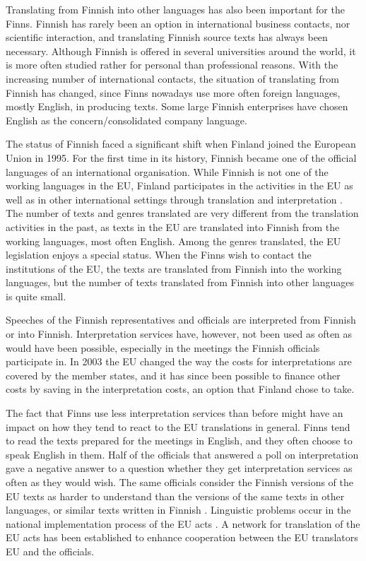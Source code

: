 \documentclass[]{../../metanetpaper}
\begin{document}
\begin{multicols}{2}
Translating from Finnish into other languages has also been important
for the Finns. Finnish has rarely been an option in international
business contacts, nor scientific interaction, and translating Finnish
source texts has always been necessary. Although Finnish is offered in
several universities around the world, it is more often studied rather
for personal than professional reasons.  With the increasing number of
international contacts, the situation of translating from Finnish has
changed, since Finns nowadays use more often foreign languages, mostly
English, in producing texts. Some large Finnish enterprises have
chosen English as the concern/consolidated company language.

The status of Finnish faced a significant shift when Finland joined
the European Union in 1995. For the first time in its history, Finnish
became one of the official languages of an international
organisation. While Finnish is not one of the working languages in the
EU, Finland participates in the activities in the EU as well as in
other international settings through translation and
interpretation \cite{Tulevaisuus2009}. The number of texts and genres
translated are very different from the translation activities in the
past, as texts in the EU are translated into Finnish from the working
languages, most often English.  Among the genres translated, the EU
legislation enjoys a special status. When the Finns wish to contact
the institutions of the EU, the texts are translated from Finnish into
the working languages, but the number of texts translated from Finnish
into other languages is quite small.

Speeches of the Finnish representatives and officials are interpreted
from Finnish or into Finnish. Interpretation services have, however,
not been used as often as would have been possible, especially in the
meetings the Finnish officials participate in. In 2003 the EU changed
the way the costs for interpretations are covered by the member
states, and it has since been possible to finance other costs by
saving in the interpretation costs, an option that Finland chose to
take.

The fact that Finns use less interpretation services than before might
have an impact on how they tend to react to the EU translations in
general. Finns tend to read the texts prepared for the meetings in
English, and they often choose to speak English in them. Half of the
officials that answered a poll on interpretation gave a negative
answer to a question whether they get interpretation services as often
as they would wish. The same officials consider the Finnish versions
of the EU texts as harder to understand than the versions of the same
texts in other languages, or similar texts written in Finnish
\cite{Piehl2008}. Linguistic problems occur in the national
implementation process of the EU acts \cite{OECD2010}. A network
for translation of the EU acts has been established to enhance
cooperation between the EU translators EU and the officials.


\end{multicols}
\end{document}
